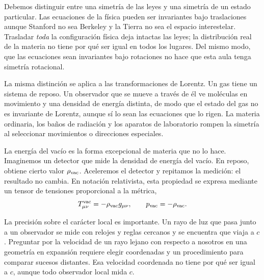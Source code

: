 Debemos distinguir entre una simetría de las leyes y una simetría de un estado particular. Las ecuaciones de la física pueden ser invariantes bajo traslaciones aunque Stanford no sea Berkeley y la Tierra no sea el espacio interestelar. Trasladar \emph{toda} la configuración física deja intactas las leyes; la distribución real de la materia no tiene por qué ser igual en todos los lugares. Del mismo modo, que las ecuaciones sean invariantes bajo rotaciones no hace que esta aula tenga simetría rotacional.

La misma distinción se aplica a las transformaciones de Lorentz. Un gas tiene un sistema de reposo. Un observador que se mueve a través de él ve moléculas en movimiento y una densidad de energía distinta, de modo que el estado del gas no es invariante de Lorentz, aunque sí lo sean las ecuaciones que lo rigen. La materia ordinaria, los baños de radiación y los aparatos de laboratorio rompen la simetría al seleccionar movimientos o direcciones especiales.

La energía del vacío es la forma excepcional de materia que no lo hace. Imaginemos un detector que mide la densidad de energía del vacío. En reposo, obtiene cierto valor \(\rho_{\rm vac}\). Aceleremos el detector y repitamos la medición: el resultado no cambia. En notación relativista, esta propiedad se expresa mediante un tensor de tensiones proporcional a la métrica,
\begin{equation}
T_{\mu\nu}^{\rm vac}=-\rho_{\rm vac}g_{\mu\nu},
\qquad
p_{\rm vac}=-\rho_{\rm vac}.
\label{eq:l08-vacuum-stress}
\end{equation}

La precisión sobre el carácter local es importante. Un rayo de luz que pasa junto a un observador se mide con relojes y reglas cercanos y se encuentra que viaja a \(c\). Preguntar por la velocidad de un rayo lejano con respecto a nosotros en una geometría en expansión requiere elegir coordenadas y un procedimiento para comparar sucesos distantes. Esa velocidad coordenada no tiene por qué ser igual a \(c\), aunque todo observador local mida \(c\).

\begin{classroomqa}
\end{classroomqa}

